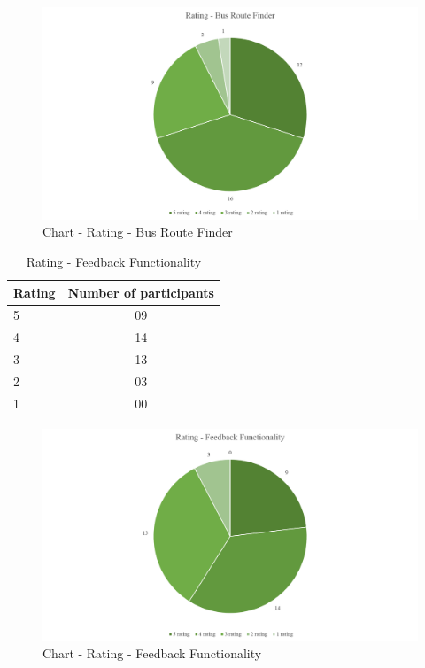 \documentclass[12pt, oneside]{report}
\begin{document}
\begin {itemize}
\begin {figure} [h]
\centering
\includegraphics [scale=0.5] {ratingBusRouteFinder}
\caption [Chart - Rating - Bus Route Finder] {Chart - Rating - Bus Route Finder}
\label {image-ratingBusRouteFinder}
\end {figure}

\begin{table} [h]
\centering
\begin{tabular}{|l|c|}
\hline
Rating & Number of participants \\
\hline
5	&09 \\
4	&14 \\
3	&13 \\
2	&03 \\
1	&00 \\
\hline
\end{tabular}
\caption{Rating - Feedback Functionality}
\label{table-survey-rating-FeedbackFunctionality}
\end{table}

\begin {figure} [h]
\centering
\includegraphics [scale=0.5] {ratingFeedbackFunctionality}
\caption [Chart - Rating - Feedback Functionality] {Chart - Rating - Feedback Functionality}
\label {image-ratingFeedbackFunctionality}
\end {figure}


\end{itemize}
\end{document}
